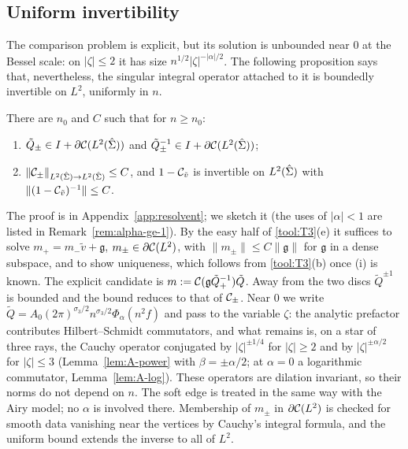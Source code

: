 \subsection{Uniform invertibility}\label{sec:he-resolvent}

The comparison problem is explicit, but its solution is unbounded near $0$ at the Bessel scale: on $|\zeta|\le2$ it has
size $n^{1/2}|\zeta|^{-|\alpha|/2}$. The following proposition says that, nevertheless, the singular integral operator
attached to it is boundedly invertible on $L^2$, uniformly in $n$.

\begin{proposition}\label{prop:UR-comparison}
There are $n_0$ and $C$ such that for $n\ge n_0$:
\begin{enumerate}
\item[(i)] $\tilde Q_\pm\in I+\partial\mathcal{C}(L^2(\hat\Sigma))$ and $\tilde Q_\pm^{-1}\in I+\partial\mathcal{C}(L^2(\hat\Sigma))$;
\item[(ii)] $\|\mathcal{C}_\pm\|_{L^2(\hat\Sigma)\to L^2(\hat\Sigma)}\le C$, and $1-\mathcal{C}_{\tilde v}$ is invertible on
  $L^2(\hat\Sigma)$ with $\|(1-\mathcal{C}_{\tilde v})^{-1}\|\le C$.
\end{enumerate}
\end{proposition}

The proof is in Appendix~\ref{app:resolvent}; we sketch it (the uses of $|\alpha|<1$ are listed in
Remark~\ref{rem:alpha-ge-1}). By the easy half of \ref{tool:T3}(e) it suffices to solve $m_+=m_-\tilde v+\mathfrak g$,
$m_\pm\in\partial\mathcal{C}(L^2)$, with $\|m_\pm\|\le C\|\mathfrak g\|$ for $\mathfrak g$ in a dense subspace, and to show uniqueness,
which follows from \ref{tool:T3}(b) once (i) is known. The explicit candidate is $m:=\mathcal{C}(\mathfrak g\tilde
Q_+^{-1})\tilde Q$. Away from the two discs $\tilde Q^{\pm1}$ is bounded and the bound reduces to that of $\mathcal{C}_\pm$.
Near $0$ we write $\tilde Q=A_0(2\pi)^{\sigma_3/2}n^{\sigma_3/2}\Phi_\alpha(n^2f)$ and pass to the variable $\zeta$: the
analytic prefactor contributes Hilbert--Schmidt commutators, and what remains is, on a star of three rays, the Cauchy
operator conjugated by $|\zeta|^{\pm1/4}$ for $|\zeta|\ge2$ and by $|\zeta|^{\pm\alpha/2}$ for $|\zeta|\le3$
(Lemma~\ref{lem:A-power} with $\beta=\pm\alpha/2$; at $\alpha=0$ a logarithmic commutator, Lemma~\ref{lem:A-log}). These
operators are dilation invariant, so their norms do not depend on $n$. The soft edge is treated in the same way with the
Airy model; no $\alpha$ is involved there. Membership of $m_\pm$ in $\partial\mathcal{C}(L^2)$ is checked for smooth data vanishing near
the vertices by Cauchy's integral formula, and the uniform bound extends the inverse to all of $L^2$.

